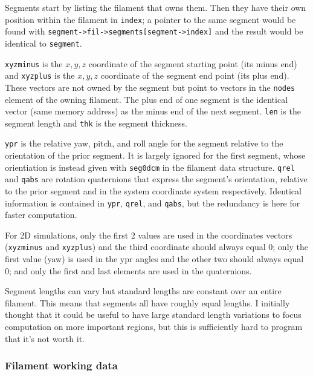 \documentclass {scrbook}
\newcommand {\ttt} {\texttt}
\begin{document}
Segments start by listing the filament that owns them. Then they have their own position within the filament in \ttt{index}; a pointer to the same segment would be found with \ttt{segment->fil->segments[segment->index]} and the result would be identical to \ttt{segment}.

\ttt{xyzminus} is the $x, y, z$ coordinate of the segment starting point (its minus end) and \ttt{xyzplus} is the $x, y, z$ coordinate of the segment end point (its plus end). These vectors are not owned by the segment but point to vectors in the \ttt{nodes} element of the owning filament. The plus end of one segment is the identical vector (same memory address) as the minus end of the next segment. \ttt{len} is the segment length and \ttt{thk} is the segment thickness.

\ttt{ypr} is the relative yaw, pitch, and roll angle for the segment relative to the orientation of the prior segment. It is largely ignored for the first segment, whose orientiation is instead given with \ttt{seg0dcm} in the filament data structure. \ttt{qrel} and \ttt{qabs} are rotation quaternions that express the segment's orientation, relative to the prior segment and in the system coordinate system respectively. Identical information is contained in \ttt{ypr}, \ttt{qrel}, and \ttt{qabs}, but the redundancy is here for faster computation.

For 2D simulations, only the first 2 values are used in the coordinates vectors (\ttt{xyzminus} and \ttt{xyzplus}) and the third coordinate should always equal 0; only the first value (yaw) is used in the ypr angles and the other two should always equal 0; and only the first and last elements are used in the quaternions.

Segment lengths can vary but standard lengths are constant over an entire filament. This means that segments all have roughly equal lengths. I initially thought that it could be useful to have large standard length variations to focus computation on more important regions, but this is sufficiently hard to program that it's not worth it.

\subsubsection{Filament working data}
\end{document}
